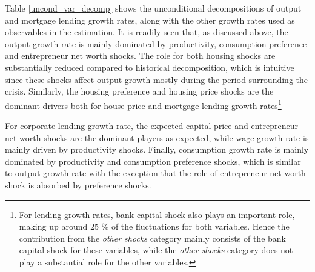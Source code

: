 \documentclass[12pt]{article}
\numberwithin{equation}{section}
\begin{document}
Table \ref{uncond_var_decomp} shows the unconditional decompositions of output and mortgage lending growth rates, along with the other growth rates used as observables in the estimation. It is readily seen that, as discussed above, the output growth rate is mainly dominated by productivity, consumption preference and entrepreneur net worth shocks. The role for both housing shocks are substantially reduced compared to historical decomposition, which is intuitive since these shocks affect output growth mostly during the period surrounding the crisis. Similarly, the housing preference and housing price shocks are the dominant drivers both for house price and mortgage lending growth rates\footnote{For lending growth rates, bank capital shock also plays an important role, making up around 25 \% of the fluctuations for both variables. Hence the contribution from the \textit{other shocks} category mainly consists of the bank capital shock for these variables, while the \textit{other shocks} category does not play a substantial role for the other variables.}

For corporate lending growth rate, the expected capital price and entrepreneur net worth shocks are the dominant players as expected, while wage growth rate is mainly driven by productivity shocks. Finally, consumption growth rate is mainly dominated by productivity and consumption preference shocks, which is similar to output growth rate with the exception that the role of entrepreneur net worth shock is absorbed by preference shocks.








\end{document}
